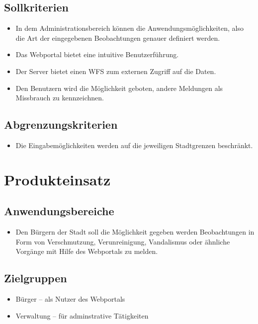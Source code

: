 \documentclass[a4paper,11pt]{scrartcl}
\begin{document}
	\subsection{Sollkriterien}
		\begin{itemize}
			\item In dem Administrationsbereich können die Anwendungsmöglichkeiten, also die Art der eingegebenen 
                    Beobachtungen genauer definiert werden.
			\item Das Webportal bietet eine intuitive Benutzerführung.
			\item Der Server bietet einen WFS zum externen Zugriff auf die Daten.
			\item Den Benutzern wird die Möglichkeit geboten, andere Meldungen als Missbrauch zu kennzeichnen.
		\end{itemize}
	\subsection{Abgrenzungskriterien}
		\begin{itemize}
			\item Die Eingabemöglichkeiten werden auf die jeweiligen Stadtgrenzen beschränkt.
		\end{itemize}
\section{Produkteinsatz}
	\subsection{Anwendungsbereiche}
		\begin{itemize}
			\item Den Bürgern der Stadt soll die Möglichkeit gegeben werden Beobachtungen in Form von Verschmutzung, Verunreinigung, Vandalismus oder ähnliche Vorgänge mit Hilfe des Webportals zu melden.
		\end{itemize}
	\subsection{Zielgruppen}
		\begin{itemize}
			\item Bürger -- als Nutzer des Webportals
			\item Verwaltung -- für adminstrative Tätigkeiten
		\end{itemize}
\end{document}
